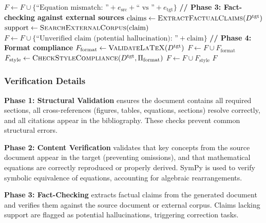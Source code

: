 \documentclass{ieeeaccess}
\begin{document}
\begin{algorithm}[!t]
\begin{algorithmic}[1]
                \State \(F \gets F \cup \{\text{``Equation mismatch: ''} + e_{\text{src}} + \text{`` vs ''} + e_{\text{tgt}}\}\)
            \EndIf
        \EndFor
    \EndIf
\EndFor
\State
\State \textbf{// Phase 3: Fact-checking against external sources}
\State \(\text{claims} \gets \textsc{ExtractFactualClaims}(D^{\text{tgt}})\) 
        \State \(\text{support} \gets \textsc{SearchExternalCorpus}(\text{claim})\)
            \State \(F \gets F \cup \{\text{``Unverified claim (potential hallucination): ''} + \text{claim}\}\)
        \EndIf
    \EndIf
\EndFor
\State
\State \textbf{// Phase 4: Format compliance}
\State \(F_{\text{format}} \gets \textsc{ValidateLaTeX}(D^{\text{tgt}})\) 
\State \(F \gets F \cup F_{\text{format}}\)
\State
\State \(F_{\text{style}} \gets \textsc{CheckStyleCompliance}(D^{\text{tgt}}, \Pi_{\text{format}})\) 
\State \(F \gets F \cup F_{\text{style}}\)
\State
\State \Return \(F\) 
\end{algorithmic}
\normalsize
\end{algorithm}

\subsubsection{Verification Details}

\textbf{Phase 1: Structural Validation} ensures the document contains all required sections, all cross-references (figures, tables, equations, sections) resolve correctly, and all citations appear in the bibliography. These checks prevent common structural errors.

\textbf{Phase 2: Content Verification} validates that key concepts from the source document appear in the target (preventing omissions), and that mathematical equations are correctly reproduced or properly derived. SymPy is used to verify symbolic equivalence of equations, accounting for algebraic rearrangements.

\textbf{Phase 3: Fact-Checking} extracts factual claims from the generated document and verifies them against the source document or external corpus. Claims lacking support are flagged as potential hallucinations, triggering correction tasks.
\end{document}
